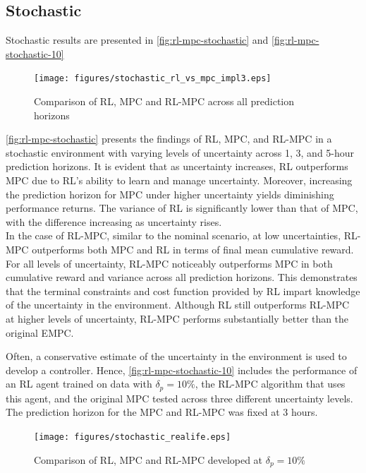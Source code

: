 \subsection{Stochastic}
Stochastic results are presented in \autoref{fig:rl-mpc-stochastic} and \autoref{fig:rl-mpc-stochastic-10}
\begin{figure}[h]
	\centering
	\texttt{[image: figures/stochastic\_rl\_vs\_mpc\_impl3.eps]}
	\caption{Comparison of RL, MPC and RL-MPC across all prediction horizons}
	\label{fig:rl-mpc-stochastic}
\end{figure}
\autoref{fig:rl-mpc-stochastic} presents the findings of RL, MPC, and RL-MPC in a stochastic environment with varying levels of uncertainty across 1, 3, and 5-hour prediction horizons. It is evident that as uncertainty increases, RL outperforms MPC due to RL's ability to learn and manage uncertainty. Moreover, increasing the prediction horizon for MPC under higher uncertainty yields diminishing performance returns. The variance of RL is significantly lower than that of MPC, with the difference increasing as uncertainty rises.\\
In the case of RL-MPC, similar to the nominal scenario, at low uncertainties, RL-MPC outperforms both MPC and RL in terms of final mean cumulative reward. For all levels of uncertainty, RL-MPC noticeably outperforms MPC in both cumulative reward and variance across all prediction horizons. This demonstrates that the terminal constraints and cost function provided by RL impart knowledge of the uncertainty in the environment. Although RL still outperforms RL-MPC at higher levels of uncertainty, RL-MPC performs substantially better than the original EMPC.

Often, a conservative estimate of the uncertainty in the environment is used to develop a controller. Hence, \autoref{fig:rl-mpc-stochastic-10} includes the performance of an RL agent trained on data with $\delta_p = 10\%$, the RL-MPC algorithm that uses this agent, and the original MPC tested across three different uncertainty levels. The prediction horizon for the MPC and RL-MPC was fixed at 3 hours.

\begin{figure}[h]
	\centering
	\texttt{[image: figures/stochastic\_realife.eps]}
	\caption{Comparison of RL, MPC and RL-MPC developed at $\delta_p = 10\%$}
	\label{fig:rl-mpc-stochastic-10}
\end{figure}

